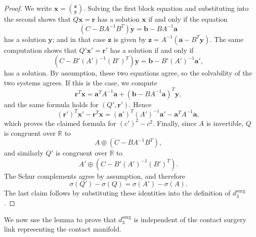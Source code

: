 \documentclass{amsart}
\numberwithin{equation}{section}
\numberwithin{figure}{section}
\theoremstyle{definition}
\theoremstyle{remark}
\begin{document}
\begin{proof}
We write \(\boldsymbol x=\binom{\boldsymbol z}{\boldsymbol y}\). Solving the first block equation and substituting into the second shows that \(Q\boldsymbol x=\boldsymbol r\) has a solution $\boldsymbol{x}$ if and only if the equation
\[
(C-BA^{-1}B^T)\boldsymbol y
=
\boldsymbol b-BA^{-1}\boldsymbol a
\]
has a solution $\boldsymbol{y}$; and in that case $\boldsymbol{z}$ is given by $\boldsymbol z=A^{-1}(\boldsymbol a-B^T\boldsymbol y)$.
The same computation shows that \(Q'\boldsymbol x'=\boldsymbol r'\) has a solution if and only if 
\[
(C-B'(A')^{-1}(B')^T)\boldsymbol y
=
\boldsymbol b-B'(A')^{-1}\boldsymbol a',
\]
has a solution. By assumption, these two equations agree, so the solvability of the two systems agrees.
If this is the case, we compute
\[
\boldsymbol r^T\boldsymbol x
=
\boldsymbol a^TA^{-1}\boldsymbol a
+
(\boldsymbol b-BA^{-1}\boldsymbol a)^T\boldsymbol y,
\]
and the same formula holds for \((Q',\boldsymbol r')\). Hence
\[
(\boldsymbol r')^T\boldsymbol x' - \boldsymbol r^T\boldsymbol x
=
(\boldsymbol a')^T(A')^{-1}\boldsymbol a'
-
\boldsymbol a^TA^{-1}\boldsymbol a,
\]
which proves the claimed formula for \((c')^2-c^2\).
Finally, since \(A\) is invertible, \(Q\) is congruent over \(\mathbb R\) to
\[
A\oplus(C-BA^{-1}B^T),
\]
and similarly \(Q'\) is congruent over \(\mathbb R\) to
\[
A'\oplus(C-B'(A')^{-1}(B')^T).
\]
The Schur complements agree by assumption, and therefore
\[
\sigma(Q')-\sigma(Q)=\sigma(A')-\sigma(A).
\]
The last claim follows by substituting these identities into the definition of \(d_3^{\mathrm{surg}}\).
\end{proof}

We now use the lemma to prove that \(d_3^{\mathrm{surg}}\) is independent of the contact surgery link representing the contact manifold.
\end{document}
